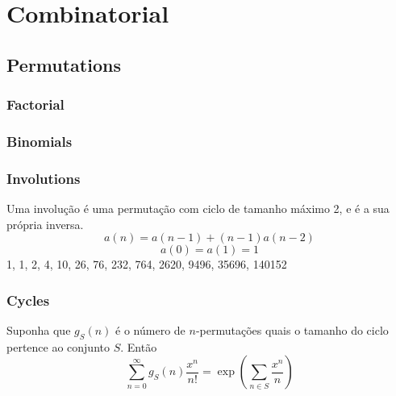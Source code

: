 \newcommand*{\Comb}[2]{{}^{#1}C_{#2}}%
\newcommand{\stirlingfirst}[2]{\genfrac{[}{]}{0pt}{}{#1}{#2}}
\newcommand{\stirlingsecond}[2]{\genfrac{\{}{\}}{0pt}{}{#1}{#2}}

\chapter{Combinatorial}

\section{Permutations}
	\subsection{Factorial}
		 

\subsection{Binomials}


 \subsection{Involutions}
    Uma involução é uma permutação com ciclo de tamanho máximo 2, e é a sua própria inversa.
    $$a(n) = a(n-1) + (n-1)a(n-2)$$
    $$a(0) = a(1) = 1$$
    1, 1, 2, 4, 10, 26, 76, 232, 764, 2620, 9496, 35696, 140152\\\hfill

\subsection{Cycles}
		Suponha que $g_S(n)$ é o número de $n$-permutações quais o tamanho do ciclo pertence ao conjunto $S$. Então
		\small
		$$\sum_{n=0} ^\infty g_S(n) \frac{x^n}{n!} = \exp\left(\sum_{n\in S} \frac{x^n} {n} \right)$$
		\normalsize

